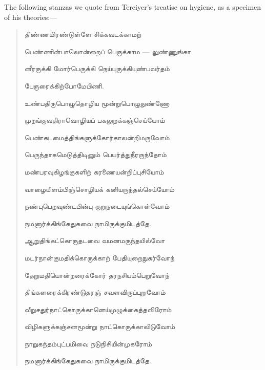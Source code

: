 \documentclass{article}
\newcommand{\TamilText}[1]{\texttamil{#1}}
\newcommand{\tam}[1]{\TamilText{#1}}
\begin{document}
The following stanzas we quote from Tereiyer's treatise on hygiene, as a specimen of his theories:---
\begin{quotation}\small
\tam{திண்ணமிரண்டுள்ளே சிக்கவடக்காமற்‌}

\tam{பெண்ணின்பாலொன்றைப்‌ பெருக்காம} --- \tam{லுண்ணுங்கா}

\tam{னீரருக்கி மோர்பெருக்கி நெய்யுருக்கியுண்பவர்தம்‌}

\tam{பேருரைக்கிற்போமேபிணி}.

\bigskip

\tam{உண்பதிருபொழுதொழிய மூன்றுபொழுதுண்ணோ}

\hspace*{5mm}\tam{முறங்குவதிராவொழியப்‌ பகலுறக்கஞ்செய்யோம்‌}

\tam{பெண்கடமைத்திங்களுக்கோர்காலன்றிமருவோம்‌}

\hspace*{5mm}\tam{பெருந்தாகமெடுத்திடினும்‌ பெயர்த்துநீரருந்தோம்‌}

\tam{மண்பரவுகிழங்குகளிற்‌ கரணையன்றிப்புசியோம்‌}

\hspace*{5mm}\tam{வாழையிளம்பிஞ்சொழியக் கனியருந்தல்செய்யோம்‌}

\tam{நண்புபெறவுண்டபின்பு குறுநடையுங்கொள்வோம்‌}

\hspace*{5mm}\tam{நமனார்க்கிங்கேதுகவை நாமிருக்குமிடத்தே}.

\bigskip

\tam{ஆறுதிங்கட்கொருதடவை வமனமருந்தயில்வோ}

\hspace*{5mm}\tam{மடர்நான்குமதிக்கொருக்காற்‌ பேதியுறைநுகர்வோந்}

\tam{தேறுமதியொன்றரைக்கோர்‌ தரநசியம்பெறுவோந்}

\hspace*{5mm}\tam{திங்களரைக்கிரண்டுதரஞ்‌ சவளவிருப்புறுவோம்‌}

\tam{வீறுசதுர்நாட்கொருக்கானெய்முழுக்கைத்தவிரோம்‌}

\hspace*{5mm}\tam{விழிகளுக்கஞ்சனமூன்று நாட்கொருக்காலிடுவோம்‌}

\tam{நாறுகந்தம்புட்பமிவை நடுநிசியின்முகரோம்‌}

\hspace*{5mm}\tam{நமனார்க்கிங்கேதுகவை நாமிருக்குமிடத்தே}.
\end{quotation}
\end{document}
